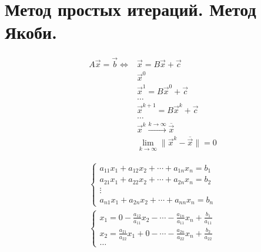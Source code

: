 \section{Метод простых итераций. Метод Якоби.}

\begin{align*}
  A \vec{x} = \vec{b} \iff &\vec{x} = B\vec{x} + \vec{c}\\
                           &\vec{x}^0\\
                           &\vec{x}^1 = B\vec{x}^0 + \vec{c} \\
                           &\dots\\
                           &\vec{x}^{k + 1}= B\vec{x}^k + \vec{c}\\
                           &\dots\\
                           &\vec{x}^k \xrightarrow{k \to \infty} \overline{\vec{x}}\\
                           &\lim_{k \to \infty} \|\vec{x}^k - \overline{\vec{x}}\| = 0
\end{align*}


\begin{gather*}
  \begin{cases}
    a_{11} x_1 + a_{12} x_2 + \cdots + a_{1n} x_n = b_1\\
    a_{21} x_1 + a_{22} x_2 + \cdots + a_{2n} x_n = b_2 \\
    \vdots \\
    a_{n1} x_1 + a_{2n} x_2 + \cdots + a_{nn} x_n = b_n
  \end{cases}\\
  \begin{cases}
    x_1 = 0 - \frac{a_{12}}{a_{11}} x_2 - \cdots - \frac{a_{1n}}{a_{11}} x_n +
    \frac{b_1}{a_{11}} \\
    x_2 = \frac{a_{21}}{a_{22}} x_1 + 0 - \cdots - \frac{a_{2n}}{a_{22}} x_n +
    \frac{b_2}{a_{22}}\\
    \dots
  \end{cases}
\end{gather*}


